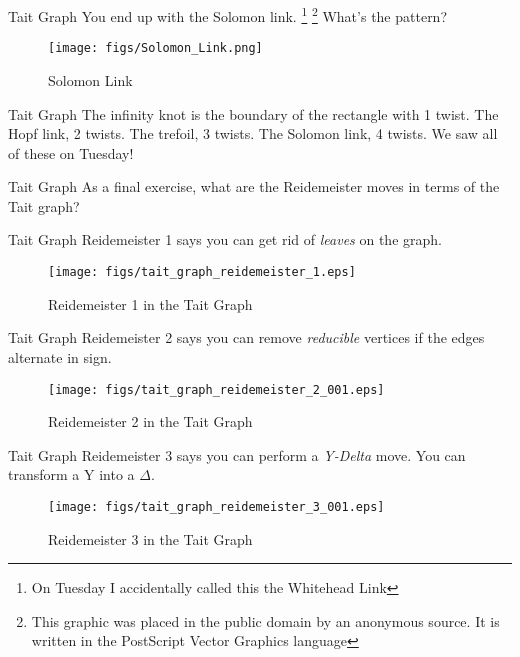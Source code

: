\documentclass{beamer}
\begin{document}
    \begin{frame}{Tait Graph}
        You end up with the Solomon link.%
        \footnote{On Tuesday I accidentally called this the Whitehead Link}
        \footnote{This graphic was placed in the public domain by an anonymous source.
                  It is written in the PostScript Vector Graphics language}
        What's the pattern?
        \begin{figure}
            \centering
            \texttt{[image: figs/Solomon\_Link.png]}
            \caption{Solomon Link}
            \label{fig:Solomon_Link}
        \end{figure}
    \end{frame}
    \begin{frame}{Tait Graph}
        The infinity knot is the boundary of the rectangle with 1 twist.
        The Hopf link, 2 twists. The trefoil, 3 twists. The Solomon link, 4 twists.
        We saw all of these on Tuesday!
    \end{frame}
    \begin{frame}{Tait Graph}
        As a final exercise, what are the Reidemeister moves in terms of the Tait graph?
    \end{frame}
    \begin{frame}{Tait Graph}
        Reidemeister 1 says you can get rid of \textit{leaves} on the graph.
        \begin{figure}
            \centering
            \texttt{[image: figs/tait\_graph\_reidemeister\_1.eps]}
            \caption{Reidemeister 1 in the Tait Graph}
            \label{fig:tait_graph_reidemeister_1}
        \end{figure}
    \end{frame}
    \begin{frame}{Tait Graph}
        Reidemeister 2 says you can remove \textit{reducible} vertices if
        the edges alternate in sign.
        \begin{figure}
            \centering
            \texttt{[image: figs/tait\_graph\_reidemeister\_2\_001.eps]}
            \caption{Reidemeister 2 in the Tait Graph}
            \label{fig:tait_graph_reidemeister_2}
        \end{figure}
    \end{frame}
    \begin{frame}{Tait Graph}
        Reidemeister 3 says you can perform a \textit{Y-Delta} move. You can transform
        a Y into a $\Delta$.
        \begin{figure}
            \centering
            \texttt{[image: figs/tait\_graph\_reidemeister\_3\_001.eps]}
            \caption{Reidemeister 3 in the Tait Graph}
            \label{fig:tait_graph_reidemeister_3}
        \end{figure}
    \end{frame}
\end{document}
